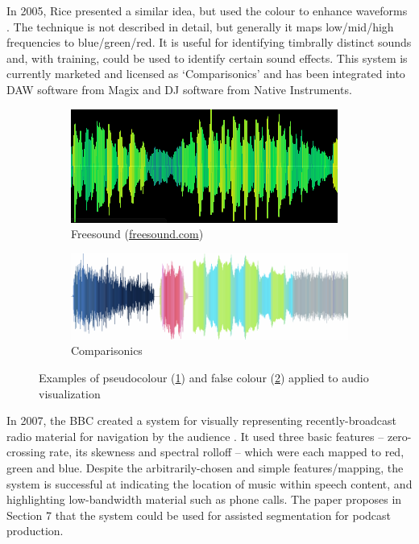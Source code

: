 In 2005, Rice presented a similar idea, but used the colour to enhance
waveforms \citep{Rice2005}. The technique is not described in detail, but
generally it maps low/mid/high frequencies to blue/green/red. It is useful for
identifying timbrally distinct sounds and, with training, could be used to
identify certain sound effects. This system is currently marketed and licensed
as `Comparisonics' and has been integrated into DAW software from Magix and DJ
software from Native Instruments.

\begin{figure}[ht]
\centering
\begin{subfigure}{.5\textwidth}
  \centering
  \includegraphics[width=\linewidth]{figs/freesound.png}
  \caption{Freesound (\url{freesound.com})}
  \label{fig:freesound}
\end{subfigure}%
\begin{subfigure}{.5\textwidth}
  \centering
  \includegraphics[width=\linewidth]{figs/rice.png}
  \caption{Comparisonics \citep{Rice2005}}
  \label{fig:rice}
\end{subfigure}
\caption{Examples of pseudocolour (\ref{fig:freesound}) and false colour
  (\ref{fig:rice}) applied to audio visualization}
\label{fig:colourvis}
\end{figure}

In 2007, the BBC created a system for visually representing recently-broadcast
radio material for navigation by the audience \citep{Mason2007}. It used three
basic features -- zero-crossing rate, its skewness and spectral rolloff --
which were each mapped to red, green and blue. Despite the arbitrarily-chosen
and simple features/mapping, the system is successful at indicating the
location of music within speech content, and highlighting low-bandwidth
material such as phone calls. The paper proposes in Section 7 that the system
could be used for assisted segmentation for podcast production.

